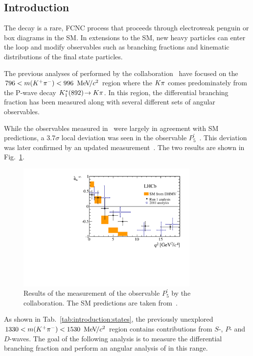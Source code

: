\subsection{Introduction}
\label{sec:kpimm:introduction}

The decay \BdToKpimm is a rare, FCNC process that proceeds through electroweak penguin or box diagrams in the SM. In extensions to the SM, new heavy particles can enter the loop and modify observables such as branching fractions and kinematic distributions of the final state particles. 

The previous analyses of \BdToKpimm performed by the \lhcb collaboration~\cite{kstmm-0.3fb,kstmm-1fb,kstmm-1fb-pprime,kstmm-3fb} have focused on the $796<m({{K}^+}{{\pi}^-})<996~{\mathrm{\,Me\kern -0.1em V\!/}c^2}$ region where the ${K}{\pi}$ comes predominately from the P-wave decay ${{K}^{*}_{1}}(892)\!\rightarrow K\pi$. In this region, the differential branching fraction has been measured along with several different sets of angular observables.

While the observables measured in~\cite{kstmm-0.3fb,kstmm-1fb} were largely in agreement with SM predictions, a 3.7$\sigma$ local deviation was seen in the observable $P_{5}^{'}$~\cite{kstmm-1fb-pprime}. This deviation was later confirmed by an updated measurement~\cite{kstmm-3fb}. The two results are shown in Fig.~\ref{fig:kpimm:p5prime}. 

\begin{figure}[!htb]
\centering
\includegraphics[width=0.8\textwidth]{figs/kpimm/introduction/P5prime.pdf}
\caption{Results of the measurement of the observable $P_{5}^{'}$ by the \lhcb collaboration. The SM predictions are taken from~\cite{pprime-theory}.}
\label{fig:kpimm:p5prime}
\end{figure}

As shown in Tab.~\ref{tab:introduction:states}, the previously unexplored $1330<m({{K}^+}{{\pi}^-})<1530~{\mathrm{\,Me\kern -0.1em V\!/}c^2}$ region contains contributions from $S$-, $P$- and $D$-waves. The goal of the following analysis is to measure the differential branching fraction and perform an angular analysis of \BdToKpimm in this \mkpi range.
 
